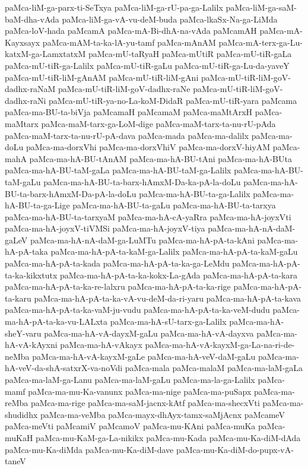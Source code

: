 {paMca-liM-ga-parx-ti-SeTxya
paMca-liM-ga-rU-pa-ga-Lalilx
paMca-liM-ga-saM-baM-dha-vAda
paMca-liM-ga-vA-vu-deM-buda
paMca-lkaSx-Na-ga-LiMda
paMca-loV-hada
paMcamA
paMca-mA-Bi-dhA-na-vAda
paMcamAH
paMca-mA-Kayxsayx
paMca-mAM-ta-ka-lA-yu-tamf
paMca-mAnAM
paMca-mA-terx-ga-Lu-katxM-ga-LamxtatxM
paMca-mU-taRyaH
paMca-mUtiR
paMca-mU-tiR-gaLa
paMca-mU-tiR-ga-Lalilx
paMca-mU-tiR-gaLu
paMca-mU-tiR-ga-Lu-da-yaveY
paMca-mU-tiR-liM-gAnAM
paMca-mU-tiR-liM-gAni
paMca-mU-tiR-liM-goV-dadhx-raNaM
paMca-mU-tiR-liM-goV-dadhx-raNe
paMca-mU-tiR-liM-goV-dadhx-raNi
paMca-mU-tiR-ya-no-La-koM-DidaR
paMca-mU-tiR-yara
paMcama
paMca-ma-BU-ta-biVja
paMcamaH
paMcamaM
paMca-maMtArxH
paMca-maMtarx
paMca-maM-tarx-ga-LoM-dige
paMca-maM-tarx-ta-nu-rU-pAda
paMca-maM-tarx-ta-nu-rU-pA-dava
paMca-mada
paMca-ma-dalilx
paMca-ma-doLu
paMca-ma-dorxVhi
paMca-ma-dorxVhiV
paMca-ma-dorxV-hiyAM
paMca-mahA
paMca-ma-hA-BU-tAnAM
paMca-ma-hA-BU-tAni
paMca-ma-hA-BUta
paMca-ma-hA-BU-taM-gaLa
paMca-ma-hA-BU-taM-ga-Lalilx
paMca-ma-hA-BU-taM-gaLu
paMca-ma-hA-BU-ta-barx-hAmxM-Da-ka-pA-la-doLu
paMca-ma-hA-BU-ta-barx-hAmxM-Da-pA-la-doLu
paMca-ma-hA-BU-ta-ga-Lalilx
paMca-ma-hA-BU-ta-ga-Lige
paMca-ma-hA-BU-ta-gaLu
paMca-ma-hA-BU-ta-tarxya
paMca-ma-hA-BU-ta-tarxyaM
paMca-ma-hA-cA-yaRra
paMca-ma-hA-joyxVti
paMca-ma-hA-joyxV-tiVMSi
paMca-ma-hA-joyxV-tiya
paMca-ma-hA-nA-daM-gaLeV
paMca-ma-hA-nA-daM-ga-LuMTu
paMca-ma-hA-pA-ta-kAni
paMca-ma-hA-pA-taka
paMca-ma-hA-pA-ta-kaM-ga-Lalilx
paMca-ma-hA-pA-ta-kaM-gaLu
paMca-ma-hA-pA-ta-kada
paMca-ma-hA-pA-ta-ka-ga-LeMdu
paMca-ma-hA-pA-ta-ka-kikxtutx
paMca-ma-hA-pA-ta-ka-kokx-La-gAda
paMca-ma-hA-pA-ta-kara
paMca-ma-hA-pA-ta-ka-re-lalxru
paMca-ma-hA-pA-ta-ka-rige
paMca-ma-hA-pA-ta-karu
paMca-ma-hA-pA-ta-ka-vA-vu-deM-da-ri-yaru
paMca-ma-hA-pA-ta-kava
paMca-ma-hA-pA-ta-ka-vaM-ju-vudu
paMca-ma-hA-pA-ta-ka-veM-dudu
paMca-ma-hA-pA-ta-ka-vu-LALxta
paMca-ma-hA-sU-tarx-ga-Lalilx
paMca-ma-hA-sheY-varu
paMca-ma-hA-vA-dayxM-gaLu
paMca-ma-hA-vA-dayxva
paMca-ma-hA-vA-kAyxni
paMca-ma-hA-vAkayx
paMca-ma-hA-vA-kayxM-ga-La-na-ri-de-neMba
paMca-ma-hA-vA-kayxM-gaLe
paMca-ma-hA-veV-daM-gaLu
paMca-ma-hA-veV-da-shA-satxrX-va-noVdi
paMca-mala
paMca-malaM
paMca-ma-laM-gaLa
paMca-ma-laM-ga-Lanu
paMca-ma-laM-gaLu
paMca-ma-la-ga-Lalilx
paMca-mamf
paMca-ma-mu-Ka-vanunx
paMca-ma-nige
paMca-ma-puSapx
paMca-ma-reMba
paMca-ma-rige
paMca-ma-saM-jacnx-kAtf
paMca-ma-shecxVti
paMca-ma-shudidhx
paMca-ma-veMba
paMca-mayx-dhAyx-tamx-saMjAcnx
paMcameV
paMca-meVti
paMcamiV
paMcamoV
paMca-mu-KAni
paMca-muKa
paMca-muKaH
paMca-mu-KaM-ga-La-nikikx
paMca-mu-Kada
paMca-mu-Ka-diM-dAda
paMca-mu-Ka-diMda
paMca-mu-Ka-diM-dave
paMca-mu-Ka-diM-do-pupx-vA-taneV
}
